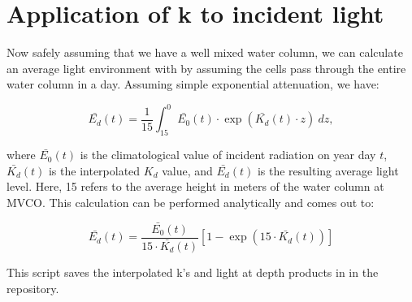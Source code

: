 \documentclass[11pt]{article}
\begin{document}
\clearpage
\section{Application of k to incident light}

Now safely assuming that we have a well mixed water column, we can calculate an average light environment with  by assuming the cells pass through the entire water column in a day. Assuming simple exponential attenuation, we have:

\begin{equation}
\bar{E_d}(t) = \frac{1}{15} \int_{15}^{0} \bar{E_0}(t) \cdot \exp(\bar{K_d}(t) \cdot z)~dz,
\end{equation}

\noindent where $\bar{E_0}(t)$ is the climatological value of incident radiation on year day $t$, $\bar{K_d}(t)$ is the interpolated $K_d$ value, and $\bar{E_d}(t)$ is the resulting average light level. Here, 15 refers to the average height in meters of the water column at MVCO.
This calculation can be performed analytically and comes out to:

\begin{equation}
\bar{E_d}(t) = \frac{\bar{E_0}(t)}{15 \cdot \bar{K_d}(t)} \left[ 1 - \exp(15 \cdot \bar{K_d}(t)) \right]
\end{equation}

\noindent This script saves the interpolated k's and light at depth products in  in the repository.
\end{document}
